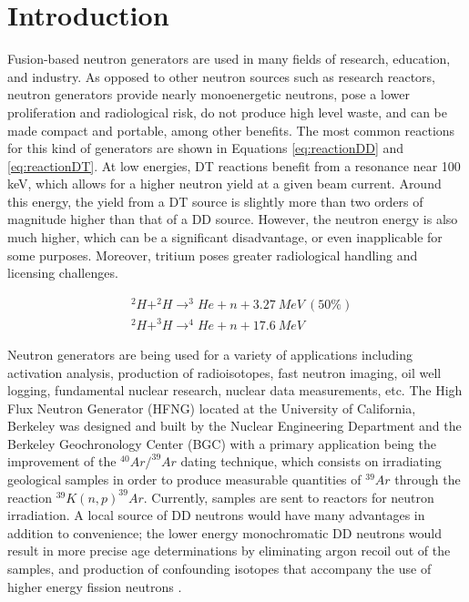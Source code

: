 \documentclass[review]{elsarticle}
\begin{document}
	\linenumbers
	
\section{Introduction}

Fusion-based neutron generators are used in many fields of research, education, and industry. As opposed to other neutron sources such as research reactors, neutron generators provide nearly monoenergetic neutrons, pose a lower proliferation and radiological risk, do not produce high level waste, and can be made compact and portable, among other benefits. The most common reactions for this kind of generators are shown in Equations \ref{eq:reactionDD} and \ref{eq:reactionDT}. At low energies, DT reactions benefit from a resonance near 100 keV, which allows for a higher neutron yield at a given beam current. Around this energy, the yield from a DT source is slightly more than two orders of magnitude higher than that of a DD source. However, the neutron energy is also much higher, which can be a significant disadvantage, or even inapplicable for some purposes. Moreover, tritium poses greater radiological handling and licensing challenges. 

\begin{align} \label{eq:reactionDD}
&^{2}H + ^{2}H \rightarrow ^{3}He + n + 3.27\ MeV\ (50\%) \\
&^{2}H + ^{3}H \rightarrow ^{4}He + n + 17.6\ MeV \label{eq:reactionDT}
\end{align}


Neutron generators are being used for a variety of applications including activation analysis, production of radioisotopes, fast neutron imaging, oil well logging, fundamental nuclear research, nuclear data measurements, etc. The High Flux Neutron Generator (HFNG) located at the University of California, Berkeley was designed and built by the Nuclear Engineering Department and the Berkeley Geochronology Center (BGC) with a primary application being the improvement of the $^{40}Ar/^{39}Ar$ dating technique, which consists on irradiating geological samples in order to produce measurable quantities of $^{39}Ar$ through the reaction $^{39}K(n,p)^{39}Ar$. Currently, samples are sent to reactors for neutron irradiation. A local source of DD neutrons would have many advantages in addition to convenience; the lower energy monochromatic DD neutrons would result in more precise age determinations by eliminating argon recoil out of the samples, and production of confounding isotopes that accompany the use of higher energy fission neutrons \cite{geochron}.
\end{document}
